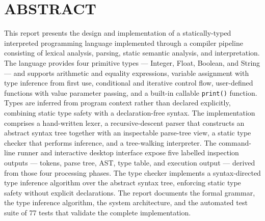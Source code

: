 \documentclass[12pt,a4paper]{report}
\begin{document}
    
    

    \clearpage
    \chapter*{ABSTRACT}
    This report presents the design and implementation of a statically-typed interpreted programming language implemented through a compiler pipeline consisting of lexical analysis, parsing, static semantic analysis, and interpretation. The language provides four primitive types --- Integer, Float, Boolean, and String --- and supports arithmetic and equality expressions, variable assignment with type inference from first use, conditional and iterative control flow, user-defined functions with value parameter passing, and a built-in callable \texttt{print()} function. Types are inferred from program context rather than declared explicitly, combining static type safety with a declaration-free syntax. The implementation comprises a hand-written lexer, a recursive-descent parser that constructs an abstract syntax tree together with an inspectable parse-tree view, a static type checker that performs inference, and a tree-walking interpreter. The command-line runner and interactive desktop interface expose five labelled inspection outputs --- tokens, parse tree, AST, type table, and execution output --- derived from those four processing phases. The type checker implements a syntax-directed type inference algorithm over the abstract syntax tree, enforcing static type safety without explicit declarations. The report documents the formal grammar, the type inference algorithm, the system architecture, and the automated test suite of 77 tests that validate the complete implementation.

    \clearpage
    \renewcommand{\contentsname}{%
      \normalfont\fontsize{14}{17}\bfseries\MakeUppercase{Contents}}
    \tableofcontents

    \clearpage

    
    \newpage
    
    \newpage
    
    \newpage
    
    \newpage
    
    \newpage
    
    \newpage
    
    \newpage
    

    \newpage
    \pagestyle{plain}
    \renewcommand{\bibsection}{%
      \chapter*{REFERENCES}%
    }
    \nocite{aho2006compilers,nystrom2021crafting,pythonDocsTkinter,pythonDocsUnittest,pythonDocsDataclasses}
    
    

    \newpage
    
\end{document}
